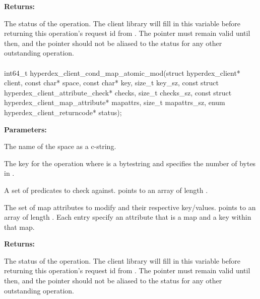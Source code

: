\noindent\textbf{Returns:}
\begin{description}[labelindent=\widthof{{\code{status}}},leftmargin=*,noitemsep,nolistsep,align=right]
\item[\code{status}] The status of the operation.  The client library will fill in this variable before returning this operation's request id from .  The pointer must remain valid until then, and the pointer should not be aliased to the status for any other outstanding operation.
\end{description}

\paragraph{}
\begin{ccode}
int64_t hyperdex_client_cond_map_atomic_mod(struct hyperdex_client* client,
                const char* space,
                const char* key, size_t key_sz,
                const struct hyperdex_client_attribute_check* checks, size_t checks_sz,
                const struct hyperdex_client_map_attribute* mapattrs, size_t mapattrs_sz,
                enum hyperdex_client_returncode* status);
\end{ccode}
\funcdesc 

\noindent\textbf{Parameters:}
\begin{description}[labelindent=\widthof{{\code{mapattrs}, \code{mapattrs\_sz}}},leftmargin=*,noitemsep,nolistsep,align=right]
\item[\code{space}] The name of the space as a c-string.
\item[\code{key}, \code{key\_sz}] The key for the operation where  is a bytestring and  specifies the number of bytes in .
\item[\code{checks}, \code{checks\_sz}] A set of predicates to check against.   points to an array of length .
\item[\code{mapattrs}, \code{mapattrs\_sz}] The set of map attributes to modify and their respective key/values.   points to an array of length .  Each entry specify an attribute that is a map and a key within that map.
\end{description}

\noindent\textbf{Returns:}
\begin{description}[labelindent=\widthof{{\code{status}}},leftmargin=*,noitemsep,nolistsep,align=right]
\item[\code{status}] The status of the operation.  The client library will fill in this variable before returning this operation's request id from .  The pointer must remain valid until then, and the pointer should not be aliased to the status for any other outstanding operation.
\end{description}


